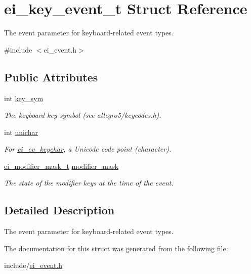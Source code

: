 \hypertarget{structei__key__event__t}{}\section{ei\+\_\+key\+\_\+event\+\_\+t Struct Reference}
\label{structei__key__event__t}


The event parameter for keyboard-\/related event types.  




{\ttfamily \#include $<$ei\+\_\+event.\+h$>$}

\subsection*{Public Attributes}
\begin{DoxyCompactItemize}
\item 
\mbox{\label{structei__key__event__t_a55a3611e3a15b95b21be4218f7fa6f3d}} 
int \hyperlink{structei__key__event__t_a55a3611e3a15b95b21be4218f7fa6f3d}{key\+\_\+sym}
\begin{DoxyCompactList}\small\item\em The keyboard key symbol (see allegro5/keycodes.\+h). \end{DoxyCompactList}\item 
\mbox{\label{structei__key__event__t_a85ecd793d10f4314b1ac8f2f46c52c88}} 
int \hyperlink{structei__key__event__t_a85ecd793d10f4314b1ac8f2f46c52c88}{unichar}
\begin{DoxyCompactList}\small\item\em For \hyperlink{ei__event_8h_a132dde064150d861ad24e9d839cbe007a65746b5440ecd78bceecfaad7ee107ad}{ei\+\_\+ev\+\_\+keychar}, a Unicode code point (character). \end{DoxyCompactList}\item 
\mbox{\label{structei__key__event__t_a35e4dc6d788b9fdd4eeedf716662afab}} 
\hyperlink{ei__event_8h_abcdd2ef0f39179463f17a06be9bdf949}{ei\+\_\+modifier\+\_\+mask\+\_\+t} \hyperlink{structei__key__event__t_a35e4dc6d788b9fdd4eeedf716662afab}{modifier\+\_\+mask}
\begin{DoxyCompactList}\small\item\em The state of the modifier keys at the time of the event. \end{DoxyCompactList}\end{DoxyCompactItemize}


\subsection{Detailed Description}
The event parameter for keyboard-\/related event types. 

The documentation for this struct was generated from the following file\+:\begin{DoxyCompactItemize}
\item 
include/\hyperlink{ei__event_8h}{ei\+\_\+event.\+h}\end{DoxyCompactItemize}
